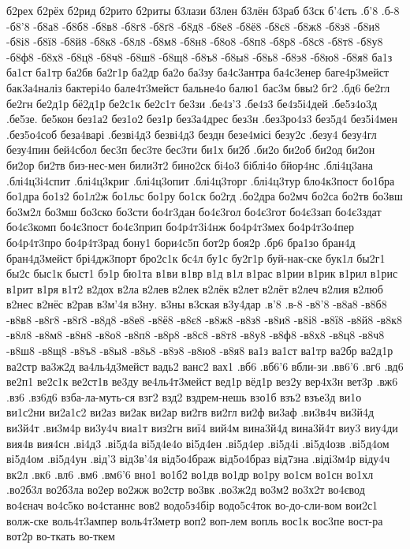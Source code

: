 {{б2рех
б2рёх
б2рид
б2рито
б2риты
б3лази
б3лен
б3лён
б3раб
б3ск
б'4єть
.б'8
.б-8
-б8'8
-б8а8
-б8б8
-б8в8
-б8г8
-б8ґ8
-б8д8
-б8е8
-б8ё8
-б8є8
-б8ж8
-б8з8
-б8и8
-б8і8
-б8ї8
-б8й8
-б8к8
-б8л8
-б8м8
-б8н8
-б8о8
-б8п8
-б8р8
-б8с8
-б8т8
-б8у8
-б8ф8
-б8х8
-б8ц8
-б8ч8
-б8ш8
-б8щ8
-б8ъ8
-б8ы8
-б8ь8
-б8э8
-б8ю8
-б8я8
ба1з
ба1ст
ба1тр
ба2бв
ба2г1р
ба2др
ба2о
ба3зу
ба4с3антра
ба4с3енер
баге4р3мейст
бак3а4наліз
бактері4о
бале4т3мейст
бальне4о
балю1
бас3м
бвы2
бг2
.бд6
бе2гл
бе2гн
бе2д1р
бё2д1р
бе2с1к
бе2с1т
бе3зи
.бе4з'3
.бе4з3
бе4з5і4дей
.бе5з4о3д
.бе5зе.
бе5кон
без1а2
без1о2
без1р
без3а4дрес
без3н
.без3ро4з3
без5д4
без5і4мен
.без5о4соб
беза4варі
.безві4д3
безві4д3
бездн
безе4місі
безу2с
.безу4
безу4гл
безу4пин
бей4сбол
бес3п
бес3те
бес3ти
би1х
би2б
.би2о
би2об
би2од
би2он
би2ор
би2тв
биз-нес-мен
били3т2
бино2ск
бі4о3
біблі4о
бйор4нс
.блі4ц3ана
.блі4ц3і4спит
.блі4ц3криг
.блі4ц3опит
.блі4ц3торг
.блі4ц3тур
бло4к3пост
бо1бра
бо1дра
бо1з2
бо1л2ж
бо1льс
бо1ру
бо1ск
бо2гд
.бо2дра
бо2мч
бо2са
бо2тв
бо3вш
бо3м2л
бо3мш
бо3ско
бо3сти
бо4г3дан
бо4є3гол
бо4є3гот
бо4є3зап
бо4є3здат
бо4є3комп
бо4є3пост
бо4є3прип
бо4р4т3і4нж
бо4р4т3мех
бо4р4т3о4пер
бо4р4т3про
бо4р4т3рад
бону1
бори4с5п
бот2р
боя2р
.бр6
бра1зо
бран4д
бран4д3мейст
брі4дж3порт
бро2с1к
бс4л
бу1с
бу2г1р
буй-нак-ске
бук1л
бы2г1
бы2с
быс1к
быст1
бэ1р
бю1та
в1ви
в1вр
в1д
в1л
в1рас
в1рии
в1рик
в1рил
в1рис
в1рит
в1ря
в1т2
в2дох
в2ла
в2лев
в2лек
в2лёк
в2лет
в2лёт
в2леч
в2лия
в2люб
в2нес
в2нёс
в2рав
в3м'4я
в3ну.
в3ны
в3ская
в3у4дар
.в'8
.в-8
-в8'8
-в8а8
-в8б8
-в8в8
-в8г8
-в8ґ8
-в8д8
-в8е8
-в8ё8
-в8є8
-в8ж8
-в8з8
-в8и8
-в8і8
-в8ї8
-в8й8
-в8к8
-в8л8
-в8м8
-в8н8
-в8о8
-в8п8
-в8р8
-в8с8
-в8т8
-в8у8
-в8ф8
-в8х8
-в8ц8
-в8ч8
-в8ш8
-в8щ8
-в8ъ8
-в8ы8
-в8ь8
-в8э8
-в8ю8
-в8я8
ва1з
ва1ст
ва1тр
ва2бр
ва2д1р
ва2стр
ва3ж2д
ва4ль4д3мейст
вадь2
ванс2
вах1
.вб6
.вб6'6
вбли-зи
.вв6'6
.вг6
.вд6
ве2п1
ве2с1к
ве2ст1в
ве3ду
ве4ль4т3мейст
вед1р
вёд1р
вез2у
вер4х3н
вет3р
.вж6
.вз6
.вз6д6
взба-ла-муть-ся
взг2
взд2
вздрем-нешь
взо1б
взъ2
взъе3д
ви1о
ви1с2ни
ви2а1с2
ви2аз
ви2ак
ви2ар
ви2гв
ви2гл
ви2ф
ви3аф
.ви3в4ч
ви3й4д
ви3й4т
.ви3м4р
ви3у4ч
виа1т
виз2гн
виї4
вий4м
вина3й4д
вина3й4т
виу3
виу4ди
вия4в
вия4сн
.ві4д3
.ві5д4а
ві5д4е4о
ві5д4ен
.ві5д4ер
.ві5д4і
.ві5д4озв
.ві5д4ом
ві5д4ом
.ві5д4ун
.від'3
від3в'4я
від5о4браж
від5о4браз
від7зна
.віді3м4р
віду4ч
вк2л
.вк6
.вл6
.вм6
.вм6'6
вно1
во1б2
во1дв
во1др
во1ру
во1см
во1сн
во1хл
.во2б3л
во2б3ла
во2ер
во2жж
во2стр
во3вк
.во3ж2д
во3м2
во3х2т
во4євод
во4єнач
во4с5ко
во4станнє
вов2
водо5з4бір
водо5с4ток
во-до-сли-вом
вои2с1
волж-ске
воль4т3ампер
воль4т3метр
воп2
воп-лем
вопль
вос1к
вос3пе
вост-ра
вот2р
во-ткать
во-ткем
}}
